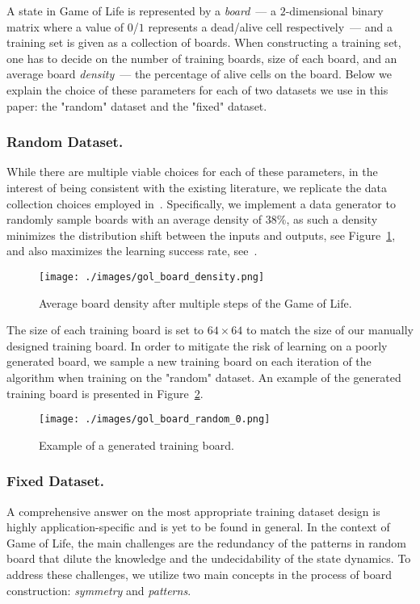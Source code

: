 \documentclass[letterpaper]{article} %
\begin{document}
A state in Game of Life is represented by a \textit{board}~--- a $2$-dimensional binary matrix where a value of $0$/$1$ represents a dead/alive cell respectively~--- and a training set is given as a collection of boards.
When constructing a training set, one has to decide on the number of training boards, size of each board, and an average board \textit{density}~--- the percentage of alive cells on the board.
Below we explain the choice of these parameters for each of two datasets we use in this paper: the "random" dataset and the "fixed" dataset.

\subsubsection{Random Dataset.}
While there are multiple viable choices for each of these parameters, in the interest of being consistent with the existing literature, we replicate the data collection choices employed in~\cite{springer2021s}.
Specifically, we implement a data generator to randomly sample boards with an average density of $38\%$, as such a density minimizes the distribution shift between the inputs and outputs, see Figure~\ref{fig:gol_board_density}, and also maximizes the learning success rate, see~\cite[Section 3.4]{springer2021s}.

\begin{figure}[h!]
    \centering
    \texttt{[image: ./images/gol\_board\_density.png]}
    \caption{Average board density after multiple steps of the Game of Life.}
    \label{fig:gol_board_density}
\end{figure}

The size of each training board is set to $64 \times 64$ to match the size of our manually designed training board.
In order to mitigate the risk of learning on a poorly generated board, we sample a new training board on each iteration of the algorithm when training on the "random" dataset.
An example of the generated training board is presented in Figure~\ref{fig:gol_board_random}.

\begin{figure}[t]
    \centering
    \texttt{[image: ./images/gol\_board\_random\_0.png]}
    \caption{Example of a generated training board.}
    \label{fig:gol_board_random}
\end{figure}


\subsubsection{Fixed Dataset.}
A comprehensive answer on the most appropriate training dataset design is highly application-specific and is yet to be found in general.
In the context of Game of Life, the main challenges are the redundancy of the patterns in random board that dilute the knowledge and the undecidability of the state dynamics.
To address these challenges, we utilize two main concepts in the process of board construction: \textit{symmetry} and \textit{patterns}.
\end{document}
